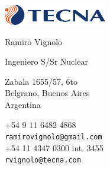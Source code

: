 \documentclass{article}
\begin{document}
\AddToShipoutPicture{\BackgroundPic}


\vspace{0.5cm plus \chico minus \chico}

\begin{minipage}{0.3\linewidth}
\par\vspace{\chico}
\par\vspace{\chico}
\par\vspace{\chico}
\vspace{1cm}
\end{minipage}
\begin{minipage}{0.4\linewidth}

\begin{center}
\href{http://www.tecna.com}{\includegraphics[width=4.5cm]{logos/logo-tecna}}\\

\smallskip

\textsf{Ramiro Vignolo}
\par
\textsf{Ingeniero S/Sr Nuclear}
\end{center}

\smallskip

\hspace{1.25cm}
\begin{minipage}{7cm}
Zabala 1655/57, 6to\\
Belgrano, Buenos Aires\\
Argentina
\end{minipage}

\begin{center}
+54 9 11 6482 4868\\
\textcolor{azul}{\texttt{ramirovignolo@gmail.com}}\\

+54 11 4347 0300 int. 3455\\
\textcolor{azul}{\texttt{rvignolo@tecna.com}}

\end{center}
\end{minipage}
\end{document}

